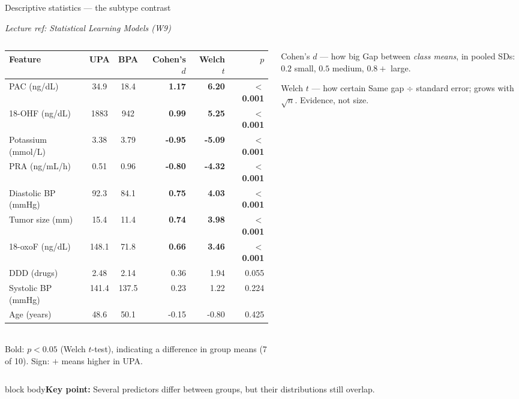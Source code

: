 \documentclass[aspectratio=169,11pt]{beamer}
\newcommand{\take}[1]{\vspace{0.3em}\begin{beamercolorbox}[wd=\textwidth,sep=6pt,rounded=true]{block body}\color{darkink}\small\textbf{Key point:} #1\end{beamercolorbox}}
\newcommand{\lecref}[1]{{\hfill\tiny\color{softgray}\textit{Lecture ref: #1}\par}\vspace{-0.4em}}
\begin{document}
\begin{frame}{Descriptive statistics --- the subtype contrast}
  \lecref{Statistical Learning Models (W9)}
  \begin{columns}[T]
    \begin{column}{0.58\textwidth}
      \scriptsize
      \setlength{\tabcolsep}{2pt}
      \begin{tabular}{lccrrr}
        \toprule
        Feature & UPA & BPA & Cohen's $d$ & Welch $t$ & $p$ \\
        \midrule
        PAC (ng/dL)      & 34.9  & 18.4  & \textbf{1.17} & \textbf{6.20} & \textbf{$<$0.001} \\
        18-OHF (ng/dL)   & 1883  & 942   & \textbf{0.99} & \textbf{5.25} & \textbf{$<$0.001} \\
        Potassium (mmol/L) & 3.38 & 3.79 & \textbf{-0.95} & \textbf{-5.09} & \textbf{$<$0.001} \\
        PRA (ng/mL/h)    & 0.51  & 0.96  & \textbf{-0.80} & \textbf{-4.32} & \textbf{$<$0.001} \\
        Diastolic BP (mmHg) & 92.3 & 84.1 & \textbf{0.75} & \textbf{4.03} & \textbf{$<$0.001} \\
        Tumor size (mm)  & 15.4  & 11.4  & \textbf{0.74} & \textbf{3.98} & \textbf{$<$0.001} \\
        18-oxoF (ng/dL)  & 148.1 & 71.8  & \textbf{0.66} & \textbf{3.46} & \textbf{$<$0.001} \\
        \midrule
        DDD (drugs)      & 2.48  & 2.14  & 0.36 & 1.94 & 0.055 \\
        Systolic BP (mmHg) & 141.4 & 137.5 & 0.23 & 1.22 & 0.224 \\
        Age (years)      & 48.6  & 50.1  & -0.15 & -0.80 & 0.425 \\
        \bottomrule
      \end{tabular}
      \\[0.4em]
      {\tiny Bold: $p<0.05$ (Welch $t$-test), indicating a difference in group means (7 of 10).
      Sign: $+$ means higher in UPA.}
    \end{column}
    \begin{column}{0.40\textwidth}
      \begin{block}{Cohen's $d$ --- how big}
        \small
        Gap between \emph{class means}, in pooled SDs:
        $0.2$ small, $0.5$ medium, $0.8+$ large.
      \end{block}
      \begin{block}{Welch $t$ --- how certain}
        \small
        Same gap $\div$ standard error; grows with $\sqrt{n}$.
        Evidence, not size.
      \end{block}
    \end{column}
  \end{columns}
  \take{Several predictors differ between groups, but their distributions still overlap.}
\end{frame}
\end{document}

